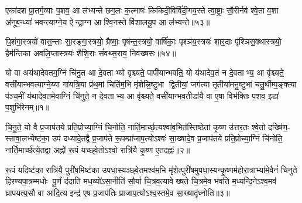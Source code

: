 {\anuvakamend[{सोमा॑य स्व॒राज्ञे॒ चतु॑स्त्रिशत्॥21॥}]}

एका॑दश प्रा॒तर्ग॒व्याः प॒शव॒ आ ल॑भ्यन्ते छग॒लः क॒ल्माषः॑ किकिदी॒विर्वि॑दी॒गय॒स्ते त्वा॒ष्ट्राः सौ॒रीर्नव॑ श्वे॒ता व॒शा अ॑नूब॒न्ध्या॑ भवन्त्याग्ने॒य ऐन्द्रा॒ग्न आश्वि॒नस्ते वि॑शालयू॒प आ ल॑भ्यन्ते॥५३॥

{\anuvakamend[{एका॑दश॒ पञ्च॑विशतिः॥22॥}]}

पि॒शंगा॒स्त्रयो॑ वास॒न्ताः सा॒रङ्गा॒स्त्रयो॒ ग्रैष्माः॒ पृष॑न्त॒स्त्रयो॒ वार्\mbox{}षि॑काः॒ पृश्ञ॑य॒स्त्रयः॑ शार॒दाः पृ॑श्ञिस॒क्थास्त्रयो॒ हैम॑न्तिका अवलि॒प्तास्त्रयः॑ शैशि॒राः सं॑वथ्स॒राय॒ निव॑ख्षसः॥५४॥


{\anuvakamend[{पि॒शङ्गा॑ विश॒तिः॥23॥}]}

{}

\setcounter{anuvakam}{0}
यो वा अय॑थादेवतम॒ग्निं चि॑नु॒त आ दे॒वताभ्यो वृश्च्यते॒ पापी॑यान्भवति॒ यो य॑थादेव॒तं न दे॒वताभ्य॒ आ वृ॑श्च्यते॒ वसी॑यान्भवत्याग्ने॒य्या गा॑यत्रि॒या प्र॑थ॒मां चिति॑म॒भि मृ॑शेत्त्रि॒ष्टुभा द्वि॒तीयां॒ जग॑त्या तृ॒तीया॑मनु॒ष्टुभा॑ चतु॒र्थीम्प॒ङ्क्त्या प॑ञ्च॒मीं य॑थादेव॒तमे॒वाग्निं चि॑नुते॒ न दे॒वताभ्य॒ आ वृ॑श्च्यते॒ वसी॑यान्भव॒तीडा॑यै॒ वा ए॒षा विभ॑क्तिः प॒शव॒ इडा॑ प॒शुभि॑रेनम्॥१॥

चि॒नु॒ते॒ यो वै प्र॒जाप॑तये प्रति॒प्रोच्या॒ग्निं चि॒नोति॒ नार्ति॒मार्च्छ॒त्यश्वा॑व॒भित॑स्तिष्ठेतां कृ॒ष्ण उ॑त्तर॒तः श्वे॒तो दख्षि॑ण॒- स्तावा॒लभ्येष्ट॑का॒ उप॑ दध्यादे॒तद्वै प्र॒जाप॑ते रू॒पम्प्रा॑जाप॒त्योऽश्वः॑ सा॒ख्षादे॒व प्र॒जाप॑तये प्रति॒प्रोच्या॒ग्निं चि॑नोति॒ नार्ति॒मार्च्छ॑त्ये॒तद्वा अह्नो॑ रू॒पं यच्छ्वे॒तोऽश्वो॒ रात्रि॑यै कृ॒ष्ण ए॒तदह्नः॑॥२॥

रू॒पं यदिष्ट॑का॒ रात्रि॑यै॒ पुरी॑ष॒मिष्ट॑का उपधा॒स्यञ्छ्वे॒तमश्व॑म॒भि मृ॑शे॒त्पुरी॑षमुपधा॒स्यन्कृ॒ष्णम॑होरा॒त्राभ्या॑मे॒वैनं॑ चिनुते हिरण्यपा॒त्रम्मधोः पू॒र्णं द॑दाति मध॒व्यो॑ऽसा॒नीति॑ सौ॒र्या चि॒त्रव॒त्यावेख्षते चि॒त्रमे॒व भ॑वति म॒ध्यन्दि॒नेऽश्व॒मव॑ घ्रापयत्य॒सौ वा आ॑दि॒त्य इन्द्र॑ ए॒ष प्र॒जाप॑तिः प्राजाप॒त्योऽश्व॒स्तमे॒व सा॒ख्षादृ॑ध्नोति॥३॥

